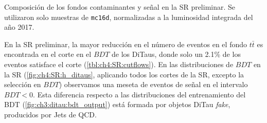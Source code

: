 \begin{margintable}[5em]
    \setlength{\tabcolsep}{0.8mm}
    
    \vspace{1em}
    \caption{Composición de los fondos contaminantes y señal en la SR preliminar. Se utilizaron solo muestras de \texttt{mc16d}, normalizadas a la luminosidad integrada del año 2017.}
    \label{tbl:ch4:SR:yields}
\end{margintable}

En la SR preliminar, la mayor reducción en el número de eventos en el fondo $t\bar{t}$ es encontrada en el corte en el $BDT$ de los DiTaus, donde solo un 2.1\% de los eventos satisface el corte (\cref{tbl:ch4:SR:cutflows}). En las distribuciones de $BDT$ en la SR (\cref{fig:ch4:SR:h_ditaus}, aplicando todos los cortes de la SR, excepto la selección en $BDT$) observamos una meseta de eventos de señal en el intervalo $BDT < 0$. Esta diferencia respecto a las distribuciones del entrenamiento del BDT (\cref{fig:ch3:ditau:bdt_output}) está formada por objetos DiTau \textit{fake}, producidos por Jets de QCD.

